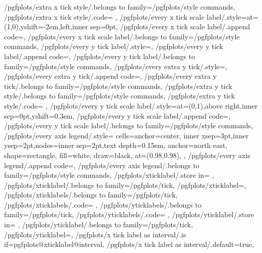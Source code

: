 {	/pgfplots/extra x tick style/.belongs to family=/pgfplots/style commands,
	/pgfplots/extra x tick style/.code={%
	},
	/pgfplots/every x tick scale label/.style={at={(1,0)},yshift=-2em,left,inner sep=0pt},
	/pgfplots/every x tick scale label/.append code={},
	/pgfplots/every x tick scale label/.belongs to family=/pgfplots/style commands,
	/pgfplots/every y tick label/.style={},
	/pgfplots/every y tick label/.append code={},
	/pgfplots/every y tick label/.belongs to family=/pgfplots/style commands,
	/pgfplots/every extra y tick/.style={},
	/pgfplots/every extra y tick/.append code={},
	/pgfplots/every extra y tick/.belongs to family=/pgfplots/style commands,
	/pgfplots/extra y tick style/.belongs to family=/pgfplots/style commands,
	/pgfplots/extra y tick style/.code={%
	},
	/pgfplots/every y tick scale label/.style={at={(0,1)},above right,inner sep=0pt,yshift=0.3em},
	/pgfplots/every y tick scale label/.append code={},
	/pgfplots/every y tick scale label/.belongs to family=/pgfplots/style commands,
	/pgfplots/every axis legend/.style={%
		cells={anchor=center},
		inner xsep=3pt,inner ysep=2pt,nodes={inner sep=2pt,text depth=0.15em},
		anchor=north east,%
		shape=rectangle,%
		fill=white,%
		draw=black,
		at={(0.98,0.98)},
	},
	/pgfplots/every axis legend/.append code={},
	/pgfplots/every axis legend/.belongs to family=/pgfplots/style commands,
	/pgfplots/xticklabel/.store in=	\pgfplots@xticklabel,
	/pgfplots/xticklabel/.belongs to family=/pgfplots/tick,
	/pgfplots/xticklabel=,
	/pgfplots/xticklabels/.belongs to family=/pgfplots/tick,
	/pgfplots/xticklabels/.code={%
		\to\pgfplots@xticklabels
		\let\pgfplots@xticklabel=\pgfplots@user@ticklabel@list@x
	},
	/pgfplots/yticklabels/.belongs to family=/pgfplots/tick,
	/pgfplots/yticklabels/.code={%
		\to\pgfplots@yticklabels
		\let\pgfplots@yticklabel=\pgfplots@user@ticklabel@list@y
	},
	/pgfplots/yticklabel/.store in=	\pgfplots@yticklabel,
	/pgfplots/yticklabel/.belongs to family=/pgfplots/tick,
	/pgfplots/yticklabel=,
	/pgfplots/x tick label as interval/.is if=pgfplots@xticklabel@interval,
	/pgfplots/x tick label as interval/.default=true,
}
